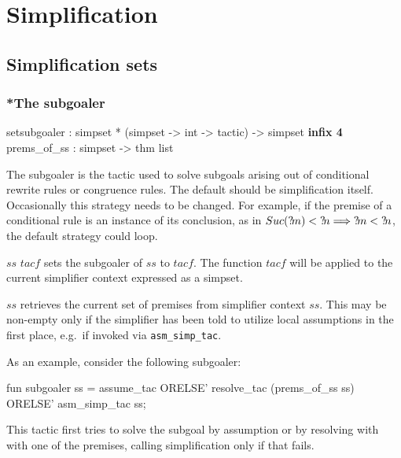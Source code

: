 
\chapter{Simplification}
\label{chap:simplification}

\section{Simplification sets} 

\subsection{*The subgoaler}\label{sec:simp-subgoaler}
\begin{ttbox}
setsubgoaler :
  simpset *  (simpset -> int -> tactic) -> simpset \hfill{\bf infix 4}
prems_of_ss  : simpset -> thm list
\end{ttbox}

The subgoaler is the tactic used to solve subgoals arising out of
conditional rewrite rules or congruence rules.  The default should be
simplification itself.  Occasionally this strategy needs to be
changed.  For example, if the premise of a conditional rule is an
instance of its conclusion, as in $Suc({?\!m}) < {?\!n} \Longrightarrow {?\!m}
< {?\!n}$, the default strategy could loop.

\begin{ttdescription}
  
\item[$ss$ \ttindexbold{setsubgoaler} $tacf$] sets the subgoaler of
  $ss$ to $tacf$.  The function $tacf$ will be applied to the current
  simplifier context expressed as a simpset.
  
\item[\ttindexbold{prems_of_ss} $ss$] retrieves the current set of
  premises from simplifier context $ss$.  This may be non-empty only
  if the simplifier has been told to utilize local assumptions in the
  first place, e.g.\ if invoked via \texttt{asm_simp_tac}.

\end{ttdescription}

As an example, consider the following subgoaler:
\begin{ttbox}
fun subgoaler ss =
    assume_tac ORELSE'
    resolve_tac (prems_of_ss ss) ORELSE'
    asm_simp_tac ss;
\end{ttbox}
This tactic first tries to solve the subgoal by assumption or by
resolving with with one of the premises, calling simplification only
if that fails.


